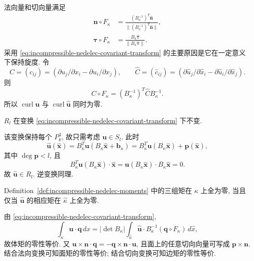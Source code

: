 法向量和切向量满足
\begin{align}
\mathbf n\circ F_\kappa
&=\frac{(B_\kappa^{-1})^T\widehat{\mathbf n}}
{\|(B_\kappa^{-1})^T\widehat{\mathbf n}\|},
\label{eq:incompressible-nedelec-normal-transform}\\
\boldsymbol\tau\circ F_\kappa
&=\frac{B_\kappa\widehat{\boldsymbol\tau}}
{\|B_\kappa\widehat{\boldsymbol\tau}\|}.
\label{eq:incompressible-nedelec-tangent-transform}
\end{align}
采用 \eqref{eq:incompressible-nedelec-covariant-transform}
的主要原因是它在一定意义下保持旋度.
令
\begin{equation}\label{eq:incompressible-nedelec-skew-matrices}
C=(c_{ij})=(\partial u_j/\partial x_i-
\partial u_i/\partial x_j),
\qquad
\widehat C=(\widehat c_{ij})
=(\partial\widehat u_j/\partial\widehat x_i-
\partial\widehat u_i/\partial\widehat x_j).
\end{equation}
则
\begin{equation}\label{eq:incompressible-nedelec-curl-transform}
C\circ F_\kappa=(B_\kappa^{-1})^T
\widehat C B_\kappa^{-1}.
\end{equation}
所以 $\operatorname{curl}\mathbf u$ 与
$\operatorname{curl}\widehat{\mathbf u}$ 同时为零.

\begin{Lemma}\label{lem:incompressible-nedelec-space-invariance}
$R_l$ 在变换
\eqref{eq:incompressible-nedelec-covariant-transform} 下不变.
\end{Lemma}

\begin{Proof}
该变换保持每个 $P_k^3$, 故只需考虑 $\mathbf u\in S_l$.
此时
\[
\widehat{\mathbf u}(\widehat{\mathbf x})
=B_\kappa^T\mathbf u(B_\kappa\widehat{\mathbf x}+\mathbf b_\kappa)
=B_\kappa^T\mathbf u(B_\kappa\widehat{\mathbf x})
+\mathbf p(\widehat{\mathbf x}),
\]
其中 $\deg\mathbf p<l$, 且
\[
B_\kappa^T\mathbf u(B_\kappa\widehat{\mathbf x})
\cdot\widehat{\mathbf x}
=\mathbf u(B_\kappa\widehat{\mathbf x})
\cdot B_\kappa\widehat{\mathbf x}=0.
\]
故 $\widehat{\mathbf u}\in R_l$. 逆变换同理.
\end{Proof}

\begin{Lemma}\label{lem:incompressible-nedelec-moment-invariance}
Definition~\ref{def:incompressible-nedelec-moments}
中的三组矩在 $\kappa$ 上全为零, 当且仅当
$\widehat{\mathbf u}$ 的相应矩在 $\widehat\kappa$ 上全为零.
\end{Lemma}

\begin{Proof}
由 \eqref{eq:incompressible-nedelec-covariant-transform},
\[
\int_\kappa\mathbf u\cdot\mathbf q\,dx
=|\det B_\kappa|
\int_{\widehat\kappa}\widehat{\mathbf u}\cdot
B_\kappa^{-1}(\mathbf q\circ F_\kappa)\,d\widehat x,
\]
故体矩的零性等价. 又
$\mathbf u\times\mathbf n\cdot\mathbf q
=-\mathbf q\times\mathbf n\cdot\mathbf u$,
且面上的任意切向向量可写成 $\mathbf p\times\mathbf n$.
结合法向变换可知面矩的零性等价;
结合切向变换可知边矩的零性等价.
\end{Proof}

